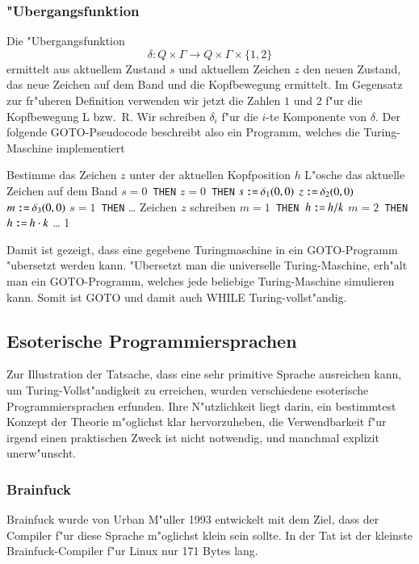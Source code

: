 \subsubsection{"Ubergangsfunktion}
Die "Ubergangsfunktion
\[
\delta\colon Q\times \Gamma\to Q\times \Gamma\times\{1, 2\}
\]
ermittelt aus aktuellem Zustand $s$ und
aktuellem Zeichen $z$ den neuen Zustand, das neue Zeichen auf
dem Band und die Kopfbewegung ermittelt. Im Gegensatz zur fr"uheren
Definition verwenden wir jetzt die Zahlen $1$ und $2$ f"ur die
Kopfbewegung L bzw.~R.
Wir schreiben $\delta_i$ f"ur die $i$-te Komponente von $\delta$.
Der folgende GOTO-Pseudocode
beschreibt also ein Programm, welches die Turing-Maschine implementiert
\begin{algorithmic}[1]
\STATE Bestimme das Zeichen $z$ unter der aktuellen Kopfposition $h$
\STATE L"osche das aktuelle Zeichen auf dem Band
$s=0${\tt\ THEN}
$z=0${\tt\ THEN}
\STATE {\tt \ \ \ \ \ \ \ \ }$s\mathbin{\texttt{:=}}\delta_1(0,0)$
\STATE {\tt \ \ \ \ \ \ \ \ }$z\mathbin{\texttt{:=}}\delta_2(0,0)$
\STATE {\tt \ \ \ \ \ \ \ \ }$m\mathbin{\texttt{:=}}\delta_3(0,0)$
$s=1${\tt\ THEN}
\STATE {\tt \ \ \ \ }\dots
{}
\STATE Zeichen $z$ schreiben
$m=1${\tt\ THEN }$h\mathbin{\texttt{:=}} h/k$
$m=2${\tt\ THEN }$h\mathbin{\texttt{:=}} h\cdot k$
\STATE \dots
{}1
\end{algorithmic}
Damit ist gezeigt, dass eine gegebene Turingmaschine in ein
GOTO-Programm "ubersetzt werden kann. "Ubersetzt man die universelle
Turing-Maschine, erh"alt man ein GOTO-Programm, welches jede beliebige
Turing-Maschine simulieren kann. Somit ist GOTO und damit auch WHILE
Turing-vollst"andig.

\subsection{Esoterische Programmiersprachen}
Zur Illustration der Tatsache, dass eine sehr primitive Sprache
ausreichen kann, um Turing-Vollst"andigkeit zu erreichen, wurden
verschiedene esoterische Programmiersprachen erfunden.
Ihre N"utzlichkeit liegt darin, ein bestimmtest Konzept der Theorie
m"oglichst klar hervorzuheben, die Verwendbarkeit f"ur irgend einen
praktischen Zweck ist nicht notwendig, und manchmal explizit unerw"unscht.

\subsubsection{Brainfuck}
Brainfuck
wurde von Urban M"uller 1993 entwickelt mit dem Ziel, dass der
Compiler f"ur diese Sprache m"oglichst klein sein sollte. In der
Tat ist der kleinste Brainfuck-Compiler f"ur Linux nur 171 Bytes
lang.

